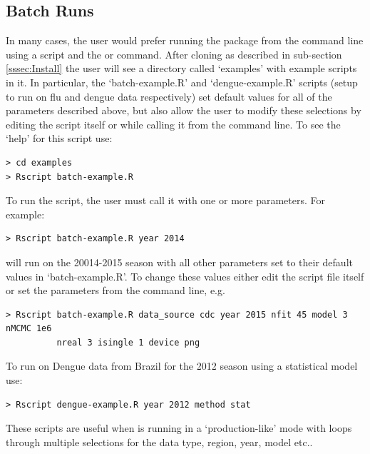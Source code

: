 \documentclass[a4paper]{article}
\begin{document}
\subsection{Batch Runs}
In many cases, the user would prefer running the package from the command line using a script and the  or  command.  After cloning  as described in sub-section \ref{sssec:Install} the user will see a directory called `examples' with example scripts in it.  In particular, the `batch-example.R' and `dengue-example.R' scripts (setup to run on flu and dengue data respectively) set default values for all of the parameters described above, but also allow the user to modify these selections by editing the script itself or while calling it from the command line.
To see the `help' for this script use:
\begin{verbatim}
> cd examples
> Rscript batch-example.R
\end{verbatim}
To run the script, the user must call it with one or more parameters. For example:
\begin{verbatim}
> Rscript batch-example.R year 2014
\end{verbatim}
will run  on the 20014-2015 season with all other parameters set to their default values in `batch-example.R'.  To change these values either edit the script file itself or set the parameters from the command line, e.g.
\begin{verbatim}
> Rscript batch-example.R data_source cdc year 2015 nfit 45 model 3 nMCMC 1e6
          nreal 3 isingle 1 device png
\end{verbatim}
To run  on Dengue data from Brazil for the 2012 season using a statistical model use:
\begin{verbatim}
> Rscript dengue-example.R year 2012 method stat
\end{verbatim}

These scripts are useful when  is running in a `production-like' mode with loops through multiple selections for the data type, region, year, model etc..


\end{document}
